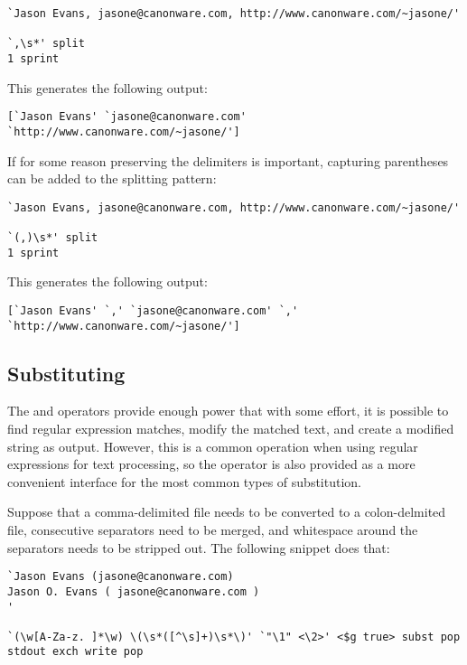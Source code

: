 \begin{verbatim}
`Jason Evans, jasone@canonware.com, http://www.canonware.com/~jasone/'

`,\s*' split
1 sprint
\end{verbatim}

This generates the following output:

\begin{verbatim}
[`Jason Evans' `jasone@canonware.com' `http://www.canonware.com/~jasone/']
\end{verbatim}

If for some reason preserving the delimiters is important, capturing parentheses
can be added to the splitting pattern:

\begin{verbatim}
`Jason Evans, jasone@canonware.com, http://www.canonware.com/~jasone/'

`(,)\s*' split
1 sprint
\end{verbatim}

This generates the following output:

\begin{verbatim}
[`Jason Evans' `,' `jasone@canonware.com' `,' `http://www.canonware.com/~jasone/']
\end{verbatim}

\subsection{Substituting}

The  and
 operators provide enough power
that with some effort, it is possible to find regular expression matches, modify
the matched text, and create a modified string as output.  However, this is a
common operation when using regular expressions for text processing, so the
 operator is also provided as a
more convenient interface for the most common types of substitution.

Suppose that a comma-delimited file needs to be converted to a colon-delmited
file, consecutive separators need to be merged, and whitespace around the
separators needs to be stripped out.  The following snippet does that:

\begin{verbatim}
`Jason Evans (jasone@canonware.com)
Jason O. Evans ( jasone@canonware.com )
'

`(\w[A-Za-z. ]*\w) \(\s*([^\s]+)\s*\)' `"\1" <\2>' <$g true> subst pop
stdout exch write pop
\end{verbatim}

